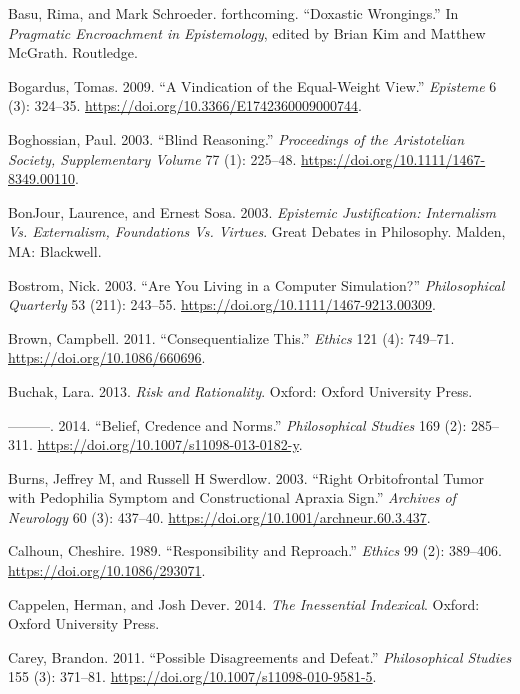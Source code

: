 \documentclass[
  10pt,
  letterpaper,
  twoside]{scrbook}
\newlength{\cslhangindent}
\newenvironment{CSLReferences}[2] %
 {\begin{list}{}{%
  \setlength{\itemindent}{0pt}
  \setlength{\leftmargin}{0pt}
  \setlength{\parsep}{0pt}
  \ifodd #1
   \setlength{\leftmargin}{\cslhangindent}
   \setlength{\itemindent}{-1\cslhangindent}
  \fi
  \setlength{\itemsep}{#2\baselineskip}}}
 {\end{list}}
\begin{document}
\begin{CSLReferences}{1}{0}
Basu, Rima, and Mark Schroeder. forthcoming. {``Doxastic Wrongings.''}
In \emph{Pragmatic Encroachment in Epistemology}, edited by Brian Kim
and Matthew McGrath. Routledge.

Bogardus, Tomas. 2009. {``A Vindication of the Equal-Weight View.''}
\emph{Episteme} 6 (3): 324--35.
\url{https://doi.org/10.3366/E1742360009000744}.

Boghossian, Paul. 2003. {``Blind Reasoning.''} \emph{Proceedings of the
Aristotelian Society, Supplementary Volume} 77 (1): 225--48.
\url{https://doi.org/10.1111/1467-8349.00110}.

BonJour, Laurence, and Ernest Sosa. 2003. \emph{Epistemic Justification:
Internalism Vs. Externalism, Foundations Vs. Virtues}. Great Debates in
Philosophy. Malden, MA: Blackwell.

Bostrom, Nick. 2003. {``Are You Living in a Computer Simulation?''}
\emph{Philosophical Quarterly} 53 (211): 243--55.
\url{https://doi.org/10.1111/1467-9213.00309}.

Brown, Campbell. 2011. {``Consequentialize This.''} \emph{Ethics} 121
(4): 749--71. \url{https://doi.org/10.1086/660696}.

Buchak, Lara. 2013. \emph{Risk and Rationality}. Oxford: Oxford
University Press.

---------. 2014. {``Belief, Credence and Norms.''} \emph{Philosophical
Studies} 169 (2): 285--311.
\url{https://doi.org/10.1007/s11098-013-0182-y}.

Burns, Jeffrey M, and Russell H Swerdlow. 2003. {``Right Orbitofrontal
Tumor with Pedophilia Symptom and Constructional Apraxia Sign.''}
\emph{Archives of Neurology} 60 (3): 437--40.
\url{https://doi.org/10.1001/archneur.60.3.437}.

Calhoun, Cheshire. 1989. {``Responsibility and Reproach.''}
\emph{Ethics} 99 (2): 389--406. \url{https://doi.org/10.1086/293071}.

Cappelen, Herman, and Josh Dever. 2014. \emph{The Inessential
Indexical}. Oxford: Oxford University Press.

Carey, Brandon. 2011. {``Possible Disagreements and Defeat.''}
\emph{Philosophical Studies} 155 (3): 371--81.
\url{https://doi.org/10.1007/s11098-010-9581-5}.


\end{CSLReferences}
\end{document}
